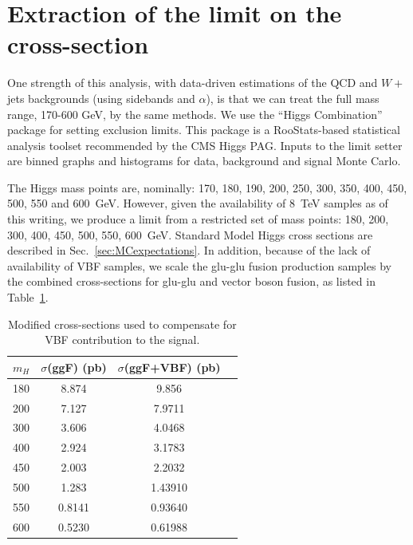 \section{Extraction of the limit on the cross-section}
\label{sec:limitExtraction}

One strength of this analysis, with data-driven estimations of the QCD
and $W+$jets backgrounds (using sidebands and $\alpha$), is that we
can treat the full mass range, 170-600 GeV, by the same methods.  We
use the ``Higgs Combination'' package \cite{cite:combine} for setting
exclusion limits. This package is a RooStats\cite{cite:roostats}-based
statistical analysis toolset recommended by the CMS Higgs PAG.  Inputs
to the limit setter are binned graphs and histograms for data,
background and signal Monte Carlo.

The Higgs mass points are, nominally: 170, 180, 190, 200, 250, 300,
350, 400, 450, 500, 550 and 600~GeV. However, given the availability
of 8~TeV samples as of this writing, we produce a limit from a
restricted set of mass points: 180, 200, 300, 400, 450, 500, 550, 600~GeV.
Standard Model Higgs cross sections are described in
Sec.~\ref{sec:MCexpectations}. In addition, because of the lack of
availability of VBF samples, we scale the glu-glu fusion production
samples by the combined cross-sections for glu-glu and vector boson
fusion, as listed in Table~\ref{tab:modxsec}.

\begin{table}[htb]
 \begin{center}
   \begin{tabular}{c|c|c|l}
     \hline
      $m_{H}$ &  $\sigma$(ggF) (pb) & $\sigma$(ggF+VBF) (pb)  \\
      \hline
      180 & 8.874 &  9.856   \\
      200 & 7.127 &  7.9711  \\
      300 & 3.606 &  4.0468  \\
      400 & 2.924 &  3.1783  \\
      450 & 2.003 &  2.2032  \\
      500 & 1.283 &  1.43910 \\
      550 & 0.8141 & 0.93640 \\
      600 & 0.5230 & 0.61988 \\
     \hline
   \end{tabular}
 \end{center}
 \caption{Modified cross-sections used to compensate for VBF contribution
   to the signal.\label{tab:modxsec}}
\end{table}

